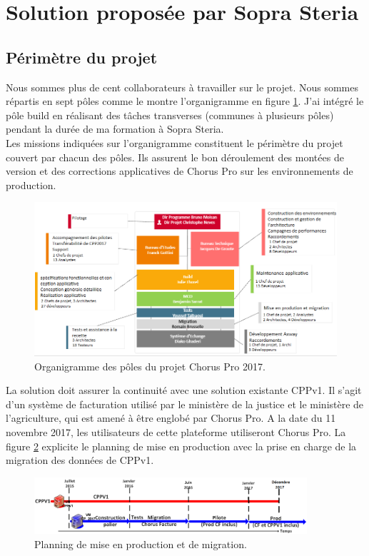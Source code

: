 \documentclass[12pt,a4paper]{article}
\begin{document}
\section{Solution proposée par Sopra Steria}
\subsection{Périmètre du projet}
Nous sommes plus de cent collaborateurs à travailler sur le projet. Nous sommes répartis en sept pôles comme le montre l'organigramme en figure \ref{organigramme}. J'ai intégré le pôle build en réalisant des tâches transverses (communes à plusieurs pôles) pendant la durée de ma formation à Sopra Steria.\\
Les missions indiquées sur l'organigramme constituent le périmètre du projet couvert par chacun des pôles. Ils assurent le bon déroulement des montées de version et des corrections applicatives de Chorus Pro sur les environnements de production.\\
\begin{figure}[!hp]
		\begin{center}
			\includegraphics[width=1.1\textwidth,keepaspectratio]{organigramme.png}
			\caption{Organigramme des pôles du projet Chorus Pro 2017.}
			\label{organigramme}
		\end{center}
\end{figure}
\clearpage
\newpage
La solution doit assurer la continuité avec une solution existante CPPv1. Il s'agit d'un système de facturation utilisé par le ministère de la justice et le ministère de l’agriculture, qui est amené à être englobé par Chorus Pro. A la date du 11 novembre 2017, les utilisateurs de cette plateforme utiliseront Chorus Pro. La figure \ref{friseCpp} explicite le planning de mise en production avec la prise en charge de la migration des données de CPPv1.
\begin{figure}[!hp]
		\begin{center}
			\includegraphics[width=0.9\textwidth,keepaspectratio]{friseCpp.png}
			\caption{Planning de mise en production et de migration.}
			\label{friseCpp}
		\end{center}
\end{figure}
\end{document}
